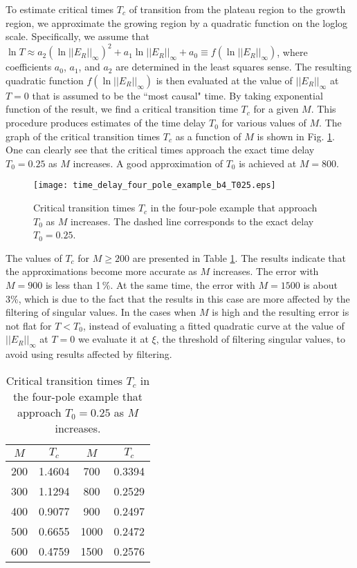 \documentclass[journal,twoside]{IEEEtran}
\begin{document}
To estimate critical times $T_c$ of transition from the plateau region to the growth region, we approximate the growing region by  a quadratic function on the loglog scale.
Specifically, we assume that 
$\ln T\approx a_2 \left(\ln ||E_R||_\infty\right)^2+a_1 \ln ||E_R||_\infty +a_0\equiv f(\ln ||E_R||_\infty)$, where coefficients $a_0$, $a_1$, and $a_2$  are determined in the least squares sense. The resulting quadratic function $f(\ln ||E_R||_\infty)$ is then evaluated at the value of $||E_R||_\infty$ at $T=0$ that is assumed to be the ``most causal" time.  By taking exponential function of the result, we find a critical transition time $T_c$ for a given $M$. This procedure produces estimates of the time delay $T_0$ for various values of $M$. The graph of the critical transition times $T_c$ as a function of $M$ is shown in Fig. \ref{Ffour_pole2}. One can clearly see that the critical times approach the exact time delay $T_0=0.25$ as $M$ increases. A good approximation of $T_0$ is achieved at $M=800$. 
\begin{figure}[h] \begin{center}
\texttt{[image: time\_delay\_four\_pole\_example\_b4\_T025.eps]}
\end{center}
\caption{Critical transition times $T_c$ in the  four-pole example that approach  $T_0$ as $M$ increases. The dashed line corresponds to the exact delay $T_0=0.25$.} 
\label{Ffour_pole2}
\end{figure}
The values of $T_c$ for $M\geq 200$ are presented in Table \ref{Tcrit_four_pole}. The results indicate that the approximations become more accurate as $M$ increases. The error with $M=900$  is less than 1\,\%. At the same time, the error with $M=1500$ is about 3\%, which is due to the fact that the results in this case are more affected by the filtering of singular values. In the cases when $M$ is high and the resulting error is not flat for $T<T_0$, instead of evaluating a fitted quadratic curve at the value of $||E_R||_\infty$ at $T=0$ we evaluate it at $\xi$, the threshold of filtering singular values, to avoid using results affected by filtering.
\begin{table}[h]
\begin{center}
\begin{tabular}{|c|c||c|c|}
\hline
\rule{0cm}{10pt}
$M$ & $T_c$ & $M$ & $T_c$  \\[3pt]
\hline
\rule{0cm}{10pt}
200 &    1.4604 & 700  & 0.3394  \\[3pt]
\hline
\rule{0cm}{10pt}  
300 &  1.1294  &   800  &  0.2529 \\[3pt]
\hline
\rule{0cm}{10pt}  
400  &  0.9077 & 900  & 0.2497 \\[3pt] 
\hline
\rule{0cm}{10pt}    
500  &  0.6655 & 1000  &  0.2472 \\
\hline
\rule{0cm}{10pt}    
600  &  0.4759 & 1500  &  0.2576 \\
\hline
\end{tabular}
\end{center}
\caption{Critical transition times $T_c$ in the four-pole example that approach $T_0=0.25$  as $M$ increases.}
\label{Tcrit_four_pole}
\end{table} 
       
\end{document}
